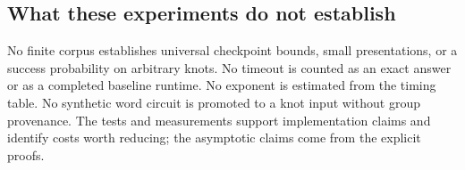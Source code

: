 \subsection{What these experiments do not establish}

No finite corpus establishes universal checkpoint bounds, small
presentations, or a success probability on arbitrary knots. No timeout is
counted as an exact answer or as a completed baseline runtime. No
exponent is estimated from the timing table. No synthetic word circuit
is promoted to a knot input without group provenance. The tests and
measurements support implementation claims and identify costs worth
reducing; the asymptotic claims come from the explicit proofs.
